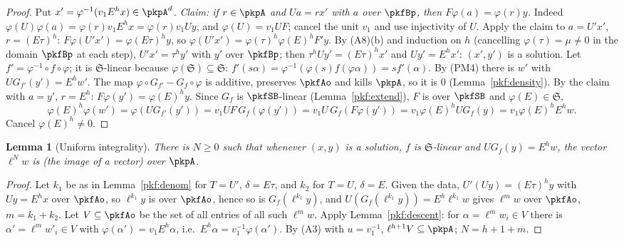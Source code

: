\documentclass[10pt]{amsart}
\newtheorem{lemma}[theorem]{Lemma}
\theoremstyle{definition}
\theoremstyle{remark}
\begin{document}
\begin{proof}
Put $x'=\varphi^{-1}(v_1E^hx)\in\pkpA^d$. \emph{Claim: if $r\in\pkpA$ and $Ua=rx'$ with $a$ over
$\pkfBp$, then $F\varphi(a)=\varphi(r)y$.} Indeed $\varphi(U)\varphi(a)=\varphi(r)v_1E^hx=\varphi(r)v_1Uy$,
and $\varphi(U)=v_1UF$; cancel the unit $v_1$ and use injectivity of $U$.
Apply the claim to $a=U'x'$, $r=(E\tau)^h$: $F\varphi(U'x')=\varphi(E\tau)^hy$, so $\varphi(U'x')=
\varphi(\tau)^h\varphi(E)^hF'y$. By (A8)(b) and induction on $h$ (cancelling $\varphi(\tau)=\mu\ne0$ in the
domain $\pkfBp$ at each step), $U'x'=\tau^hy'$ with $y'$ over $\pkfBp$; then $\tau^hUy'=(E\tau)^hx'$ and
$Uy'=E^hx'$: $(x',y')$ is a solution.
Let $f'=\varphi^{-1}\circ f\circ\varphi$; it is $\mathfrak S$-linear because $\varphi(\mathfrak S)\subseteq
\mathfrak S$: $f'(s\alpha)=\varphi^{-1}(\varphi(s)f(\varphi\alpha))=sf'(\alpha)$. By (PM4) there is $w'$ with
$UG_{f'}(y')=E^hw'$. The map $\varphi\circ G_{f'}-G_f\circ\varphi$ is additive, preserves $\pkfAo$ and
kills $\pkpA$, so it is $0$ (Lemma~\ref{pkf:density}). By the claim with $a=y'$, $r=E^h$:
$F\varphi(y')=\varphi(E)^hy$. Since $G_f$ is $\pkfSB$-linear (Lemma~\ref{pkf:extend}), $F$ is over
$\pkfSB$ and $\varphi(E)\in\mathfrak S$,
\[\varphi(E)^h\varphi(w')=\varphi(UG_{f'}(y'))=v_1UF\,G_f(\varphi(y'))=v_1U\,G_f(F\varphi(y'))
=v_1\varphi(E)^hUG_f(y)=v_1\varphi(E)^hE^hw .\]
Cancel $\varphi(E)^h\ne0$.
\end{proof}

\begin{lemma}[Uniform integrality]\label{pkf:integral}
There is $N\ge0$ such that whenever $(x,y)$ is a solution, $f$ is $\mathfrak S$-linear and
$UG_f(y)=E^hw$, the vector $\ell^Nw$ is (the image of a vector) over $\pkpA$.
\end{lemma}

\begin{proof}
Let $k_1$ be as in Lemma~\ref{pkf:denom} for $T=U'$, $\delta=E\tau$, and $k_2$ for $T=U$, $\delta=E$. Given the data,
$U'(Uy)=(E\tau)^hy$ with $Uy=E^hx$ over $\pkfAo$, so $\ell^{k_1}y$ is over $\pkfAo$, hence so is
$G_f(\ell^{k_1}y)$, and $U(G_f(\ell^{k_1}y))=E^h\ell^{k_1}w$ gives $\ell^{m}w$ over $\pkfAo$, $m=k_1+k_2$.
Let $V\subseteq\pkfAo$ be the set of all entries of all such $\ell^mw$. Apply
Lemma~\ref{pkf:descent}: for $\alpha=\ell^mw_i\in V$ there is $\alpha'=\ell^mw'_i\in V$ with
$\varphi(\alpha')=v_1E^h\alpha$, i.e.\ $E^h\alpha=v_1^{-1}\varphi(\alpha')$. By (A3) with $u=v_1^{-1}$,
$\ell^{h+1}V\subseteq\pkpA$; $N=h+1+m$.
\end{proof}
\end{document}
